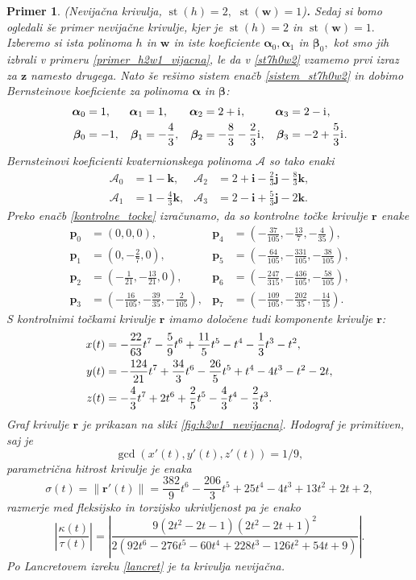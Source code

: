 \documentclass[12pt,a4paper,twoside]{article}
\newcommand{\iu}{\mathrm{i}\mkern1mu} %
\theoremstyle{definition} %
\theoremstyle{plain} %
\theoremstyle{primerstyle}
\newtheorem{primer}[definicija]{Primer}
\numberwithin{equation}{section}  %
\newcommand{\pV}{\mathbf{p}}
\newcommand{\rV}{\mathbf{r}}
\newcommand{\iV}{\mathbf{i}}
\newcommand{\jV}{\mathbf{j}}
\newcommand{\kV}{\mathbf{k}}
\newcommand{\wV}{\mathbf{w}}
\newcommand{\zV}{\mathbf{z}}
\newcommand{\AQ}{\mathcal{A}}
\newcommand{\balpha}{\boldsymbol \alpha}
\newcommand{\bbeta}{\boldsymbol \beta}
\DeclareMathOperator{\st}{st}
\begin{document}
\begin{primer}
	\label{primer_h2w1_nevijacna}
	\textnormal{ }(Nevijačna krivulja, $\st(h)=2,$ $\st(\wV)=1$)\textbf{.}
	Sedaj si bomo ogledali še primer nevijačne krivulje, kjer je $\st(h)=2$ in $\st(\wV)=1.$ Izberemo si ista polinoma $h$ in $\wV$ in iste koeficiente $\balpha_0,\balpha_1$ in $\bbeta_0,$ kot smo jih izbrali v primeru \ref{primer_h2w1_vijacna}, le da v \eqref{st7h0w2} vzamemo prvi izraz za $\zV$ namesto drugega. Nato še rešimo sistem enačb \eqref{sistem_st7h0w2} in dobimo Bernsteinove koeficiente za polinoma $\balpha$ in $\bbeta$:
	\begin{align*}
	\balpha_0&=1,&\balpha_1&=1,&\balpha_2&=2+\iu,&\balpha_3&=2-\iu,\\
		\bbeta_0&=-1,&\bbeta_1&=-\frac{4}{3},&\bbeta_2&=-\frac{8}{3}-\frac{2}{3}\iu,&\bbeta_3&=-2+\frac{5}{3}\iu.
	\end{align*}
	Bernsteinovi koeficienti kvaternionskega polinoma $\AQ$ so tako enaki
	\begin{align*}
		\AQ_0&=1-\kV,&\AQ_2&=2+\iV-\frac{2}{3}\jV-\frac{8}{3}\kV,\\
		\AQ_1&=1-\frac{4}{3}\kV,&\AQ_3&=2-\iV+\frac{5}{3}\jV-2\kV.
	\end{align*}
	Preko enačb \eqref{kontrolne_tocke} izračunamo, da so kontrolne točke krivulje $\rV$ enake
	\begin{align*}
		\pV_0&=(0,0,0),&\pV_4&=\left(-\frac{37}{105},-\frac{13}{7},-\frac{4}{35}\right),\\
		\pV_1&=\left(0,-\frac{2}{7},0\right),&\pV_5&=\left(-\frac{64}{105},-\frac{331}{105},-\frac{38}{105}\right),\\
		\pV_2&=\left(-\frac{1}{21},-\frac{13}{21},0\right),&\pV_6&=\left(-\frac{247}{315},-\frac{436}{105},-\frac{58}{105}\right),\\
		\pV_3&=\left(-\frac{16}{105},-\frac{39}{35},-\frac{2}{105}\right),&\pV_7&=\left(-\frac{109}{105},-\frac{202}{35},-\frac{14}{15}\right).
	\end{align*}
	S kontrolnimi točkami krivulje $\rV$ imamo določene tudi komponente krivulje $\rV$:
	\begin{align}
		x(t)&=-\frac{22}{63}t^7-\frac{5}{9}t^6+\frac{11}{5}t^5-t^4-\frac{1}{3}t^3-t^2,\notag\\
		y(t)&=-\frac{124}{21}t^7+\frac{34}{3}t^6-\frac{26}{5}t^5+t^4-4t^3-t^2-2t,\label{primer_h2w1_nevijacna_krivulja}\\
		z(t)&=-\frac{4}{3}t^7+2t^6+\frac{2}{5}t^5-\frac{4}{3}t^4-\frac{2}{3}t^3.\notag
	\end{align}
	Graf krivulje $\rV$ je prikazan na sliki \ref{fig:h2w1_nevijacna}. Hodograf je primitiven, saj je $$\gcd(x'(t),y'(t),z'(t))=1/9,$$ parametrična hitrost krivulje je enaka
	\begin{equation*}
		\sigma(t)=\lVert\rV'(t)\rVert=\frac{382}{9}t^6-\frac{206}{3}t^5+25t^4-4t^3+13t^2+2t+2,
	\end{equation*}
	razmerje med fleksijsko in torzijsko ukrivljenost pa je enako $$\left|\frac{\kappa(t)}{\tau(t)}\right|=\left|\frac{9(2t^2-2t-1)(2t^2-2t+1)^2}{2(92t^6-276t^5-60t^4+228t^3-126t^2+54t+9)}\right|.$$ Po Lancretovem izreku \ref{lancret} je ta krivulja nevijačna.
	

\end{primer}
\end{document}
